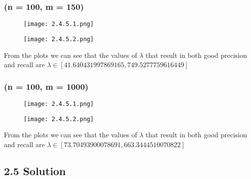 \documentclass{article}
\begin{document}
\subsubsection*{(n = 100, m = 150)}
\begin{figure}[h]
    \centering
    \begin{minipage}{0.45\linewidth}
        \centering
        \texttt{[image: 2.4.5.1.png]}
    \end{minipage}%
    \hspace{0.05\linewidth} %
    \begin{minipage}{0.45\linewidth}
        \centering
        \texttt{[image: 2.4.5.2.png]}
    \end{minipage}
\end{figure}
From the plots we can see that the values of $\lambda$ that result in both good precision and recall are $\lambda \in [41.640431997869165, 749.5277759616449]$



\subsubsection*{(n = 100, m = 1000)}
\begin{figure}[h]
    \centering
    \begin{minipage}{0.45\linewidth}
        \centering
        \texttt{[image: 2.4.5.1.png]}
    \end{minipage}%
    \hspace{0.05\linewidth} %
    \begin{minipage}{0.45\linewidth}
        \centering
        \texttt{[image: 2.4.5.2.png]}
    \end{minipage}
\end{figure}
From the plots we can see that the values of $\lambda$ that result in both good precision and recall are $\lambda \in [73.70493900078691, 663.3444510070822]$

\subsection*{2.5 Solution}
\end{document}
